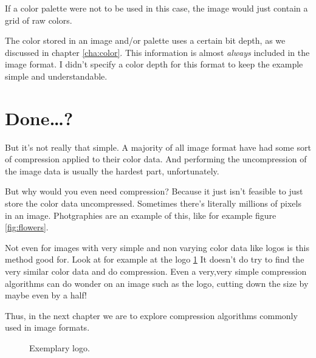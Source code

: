 \begin{refsection}
  If a color palette were not to be used in this case, the image would
  just contain a grid of raw colors.

  The color stored in an image and/or palette uses a certain bit
  depth, as we discussed in chapter \ref{cha:color}. This information
  is almost \textit{always} included in the image format. I didn't
  specify a color depth for this format to keep the example simple and
  understandable.

  \section{Done\dots?}
  \label{sec:done}

  But it's not really that simple. A majority of all image format have
  had some sort of compression applied to their color data. And
  performing the uncompression of the image data is usually the
  hardest part, unfortunately.

  But why would you even need compression?  Because it just isn't
  feasible to just store the color data uncompressed. Sometimes
  there's literally millions of pixels in an image. Photgraphies are
  an example of this, like for example figure \ref{fig:flowers}.

  Not even for images with very simple and non varying color data like
  logos is this method good for. Look at for example at the logo
  \ref{fig:logo} It doesn't do try to find the very similar color data
  and do compression. Even a very,very simple compression algorithms
  can do wonder on an image such as the logo,  cutting down the size by
  maybe even by a half!

  Thus, in the next chapter we are to explore compression algorithms
  commonly used in image formats.


  \begin{figure}[h!]
    \centering
    \newcommand{\shieldcolor}{red}
    \caption{Exemplary logo.}
    \label{fig:logo}
  \end{figure}


\end{refsection}
